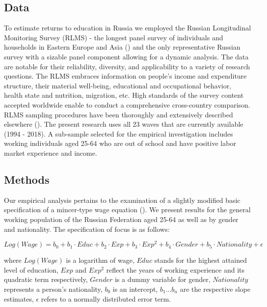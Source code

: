 \documentclass[12pt,a4paper]{article}
\begin{document}
\subsection*{Data}

To estimate returns to education in Russia we employed the Russian Longitudinal Monitoring Survey (RLMS) - the longest panel survey of individuals and households in Eastern Europe and Asia (\cite{kozyreva_081._2015}) and the only representative Russian survey with a sizable panel component allowing for a dynamic analysis. The data are notable for their reliability, diversity, and applicability to a variety of research questions. The RLMS embraces information on people's income and expenditure structure, their material well-being, educational and occupational behavior, health state and nutrition, migration, etc. High standards of the survey content accepted worldwide enable to conduct a comprehensive cross-country comparison. RLMS sampling procedures have been thoroughly and extensively described elsewhere (\cite{kozyreva_081._2015}). The present research uses all 23 waves that are currently available (1994 - 2018). A sub-sample selected for the empirical investigation includes working individuals aged 25-64 who are out of school and have positive labor market experience and income.
\\

\subsection*{Methods}

Our empirical analysis pertains to the examination of a slightly modified basic specification of a mincer-type wage equation (\cite{mincer_082._1974}). We present results for the general working population of the Russian Federation aged 25-64 as well as by gender and nationality. The specification of focus is as follows:

$$Log(Wage) = b_0 + b_1\cdot Educ + b_2\cdot Exp + b_3\cdot Exp^2 + b_4\cdot Gender + b_5\cdot Nationality + \epsilon$$

where $Log(Wage)$ is a logarithm of wage, $Educ$ stands for the highest attained level of education, $Exp$ and $Exp^2$ reflect the years of working experience and its quadratic term respectively, $Gender$ is a dummy variable for gender, $Nationality$ represents a person's nationality, $b_0$ is an intercept, $b_1 ... b_n$ are the respective slope estimates, $\epsilon$ refers to a normally distributed error term.
\\
\end{document}
